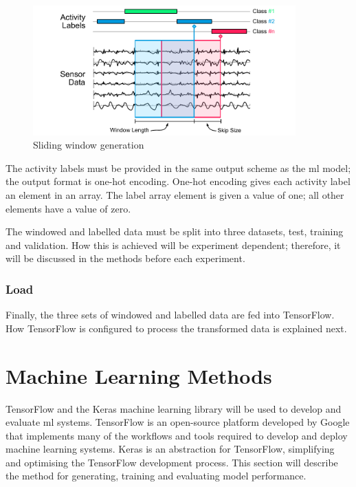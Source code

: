 \begin{figure}[!htb]
    \centering
    \includegraphics[width=0.9\textwidth]{content/3-Methods/Sliding_Window.pdf}
    \caption{Sliding window generation}
    \label{fig:methods-data-window-generation}
\end{figure}

The activity labels must be provided in the same output scheme as the \acrshort{ml} model; the output format is one-hot encoding. One-hot encoding gives each activity label an element in an array. The label array element is given a value of one; all other elements have a value of zero.

The windowed and labelled data must be split into three datasets, test, training and validation. How this is achieved will be experiment dependent; therefore, it will be discussed in the methods before each experiment.

\subsubsection{Load}
Finally, the three sets of windowed and labelled data are fed into TensorFlow. How TensorFlow is configured to process the transformed data is explained next.


\section{Machine Learning Methods}
\label{sec:ch3-machine_Learning}
TensorFlow\cite{tensorflow2015-whitepaper} and the Keras\cite{chollet2015keras} machine learning library will be used to develop and evaluate \acrshort{ml} systems. TensorFlow is an open-source platform developed by Google that implements many of the workflows and tools required to develop and deploy machine learning systems. Keras is an abstraction for TensorFlow, simplifying and optimising the TensorFlow development process. This section will describe the method for generating, training and evaluating model performance.

